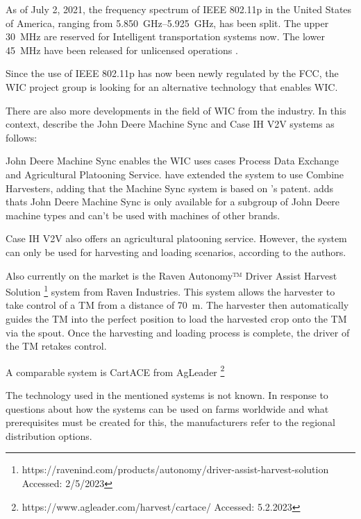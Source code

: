 As of July 2, 2021, the frequency spectrum of IEEE 802.11p in the United States of America, ranging from
\SIrange{5,850}{5,925}{\giga\hertz}, has been split. The upper \SI{30}{\mega\hertz} are reserved for
Intelligent transportation systems now. The lower \SI{45}{\mega\hertz} have been released for unlicensed
operations \cite{FCC202111p}.

Since the use of IEEE 802.11p has now been newly
regulated by the FCC, the \ac{WIC} project group is looking for an alternative technology that enables \ac{WIC}.





There are also more developments in the field of \ac{WIC} from the industry. In this context, \textcite{thomasson_review_2018} describe the John Deere Machine Sync and Case IH V2V systems as follows:

John Deere Machine Sync enables the \ac{WIC} uses cases Process Data Exchange and Agricultural Platooning Service. \textcite{liu_automation_2022} have extended the system to use Combine Harvesters, adding that the Machine Sync system is based on \textcite{metzler_system_2006}'s patent.
\textcite{smolnik_5g_2020} adds thats John Deere Machine Sync is only available for a subgroup of John Deere machine types and can't be used with machines of other brands.

Case IH V2V also offers an agricultural platooning service. However, the system can only be used for harvesting and loading scenarios, according to the authors.

Also currently on the market is the Raven Autonomy™ Driver Assist Harvest Solution \footnote{https://ravenind.com/products/autonomy/driver-assist-harvest-solution Accessed: 2/5/2023} system from Raven Industries. This system allows the harvester to take control of a \ac{TM} from a distance of \SI{70}{\metre}. The harvester then automatically guides the \ac{TM} into the perfect position to load the harvested crop onto the \ac{TM} via the spout. Once the harvesting and loading process is complete, the driver of the \ac{TM} retakes control.

A comparable system is CartACE from AgLeader \footnote{https://www.agleader.com/harvest/cartace/ Accessed: 5.2.2023}

The technology used in the mentioned systems is not known. In response to questions about how the systems can be used on farms worldwide and what prerequisites must be created for this, the manufacturers refer to the regional distribution options.




